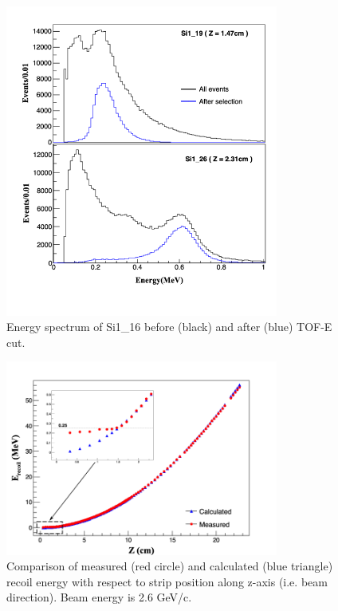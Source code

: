 \documentclass[number]{elsarticle}
\begin{document}
\begin{figure}[htbp]
\centering
\includegraphics[width=0.8\textwidth]{./comparison_tof_e_cut.png}
\caption{Energy spectrum of Si1\_16 before (black) and after (blue) TOF-E cut.}
\label{fig:cut}
\end{figure}

\begin{figure}[htbp]
\centering
\includegraphics[width=0.8\textwidth]{./calc_vs_measured_combined.png}
\caption{
Comparison of measured (red circle) and calculated (blue triangle) recoil energy with respect to strip position along z-axis (i.e. beam direction). Beam energy is 2.6 GeV/c.}
\label{fig:measured_vs_calculated}
\end{figure}
\end{document}
